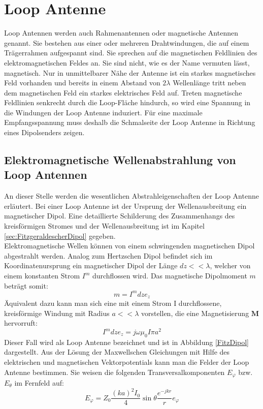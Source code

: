 



\newpage
\section{Loop Antenne}
Loop Antennen werden auch Rahmenantennen oder magnetische Antennen genannt. Sie bestehen aus einer oder mehreren Drahtwindungen, die auf einem Trägerrahmen aufgespannt sind. Sie sprechen auf die magnetischen Feldlinien des elektromagnetischen Feldes an. Sie sind nicht, wie es der Name vermuten lässt, magnetisch. Nur in unmittelbarer Nähe der Antenne ist ein starkes magnetisches Feld vorhanden und bereits in einem Abstand von $2\lambda$ Wellenlänge tritt neben dem magnetischen Feld ein starkes elektrisches Feld auf. Treten magnetische Feldlinien senkrecht durch die Loop-Fläche hindurch, so wird eine Spannung in die Windungen der Loop Antenne induziert. Für eine maximale Empfangsspannung muss deshalb die Schmalseite der Loop Antenne in Richtung eines Dipolsenders zeigen.


\subsection{Elektromagnetische Wellenabstrahlung von Loop Antennen}
An dieser Stelle werden die wesentlichen Abstrahleigenschaften der Loop Antenne erläutert.
Bei einer Loop Antenne ist der Ursprung der Wellenausbreitung ein magnetischer Dipol. Eine detaillierte Schilderung des Zusammenhangs des kreisförmigen Stromes und der Wellenausbreitung ist im Kapitel \ref{sec:FitzgeraldescherDipol} gegeben. \\
Elektromagnetische Wellen können von einem schwingenden magnetischen Dipol
abgestrahlt werden. Analog zum Hertzschen Dipol befindet sich im Koordinatenursprung
ein magnetischer Dipol der Länge $dz<<\lambda$, welcher von einem konstanten
Strom $I^{m}$ durchflossen wird. Das magnetische Dipolmoment $m$ beträgt somit:
\begin{equation}
m=I^{m}dze_z
\end{equation}
Äquivalent dazu kann man sich eine mit einem Strom I durchflossene, kreisförmige Windung mit Radius $a<<\lambda$ vorstellen, die eine Magnetisierung $\textbf{M}$ hervorruft:
\begin{equation}
I^{m}dze_{z}=j\omega\mu_{0}I\pi a^{2}
\end{equation}
Dieser Fall wird als Loop Antenne bezeichnet und ist in Abbildung \ref{FitzDipol} dargestellt. Aus der Lösung der Maxwellschen Gleichungen mit Hilfe des elektrischen und
magnetischen Vektorpotentials kann man die Felder der Loop Antenne bestimmen.
Sie weisen die folgenden Transversalkomponenten $E_{\varphi}$ bzw. $E_{\theta}$ im Fernfeld auf:
\begin{equation}
E_{\varphi}=Z_{0}\dfrac{(ka)^2I_{0}}{4}\sin \theta \dfrac{e^{-jkr}}{r} e_{\varphi}
\end{equation}

